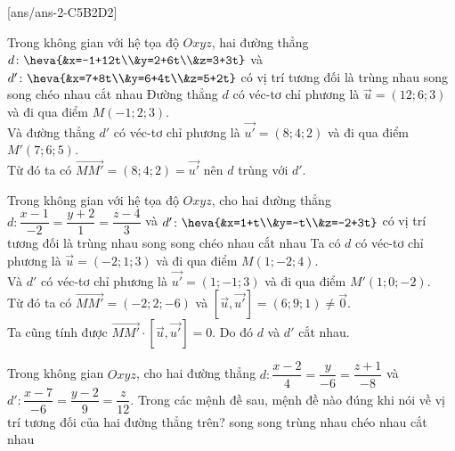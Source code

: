 [ans/ans-2-C5B2D2]
\TN
\begin{ex}%
Trong không gian với hệ tọa độ $Oxyz$, hai đường thẳng $d \colon \heva{&x=-1+12t\\&y=2+6t\\&z=3+3t}$ và  $d' \colon \heva{&x=7+8t\\&y=6+4t\\&z=5+2t}$ có vị trí tương đối là
	\choice
	{\True trùng nhau}
	{song song}
	{chéo nhau}
	{cắt nhau}
	\loigiai
	{Đường thẳng $d$ có véc-tơ chỉ phương là  $\overrightarrow{u}=(12;6;3)$ và đi qua điểm $M(-1;2;3)$.\\
	Và đường thẳng $d'$ có véc-tơ chỉ phương là  $\overrightarrow{u'}=(8;4;2)$ và đi qua điểm $M'(7;6;5)$.\\
	Từ đó ta có $\overrightarrow{MM'}=(8;4;2)=\overrightarrow{u'}$ nên $d$ trùng với $d'$.}
	\end{ex}
\begin{ex}%
	Trong không gian với hệ tọa độ $Oxyz$, cho hai đường thẳng $d \colon \dfrac{x-1}{-2}=\dfrac{y+2}{1}=\dfrac{z-4}{3}$ và  $ d' \colon \heva{&x=1+t\\&y=-t\\&z=-2+3t}$ có vị trí tương đối là
	\choice
	{trùng nhau}
	{song song}
	{chéo nhau}
	{\True  cắt nhau}
	\loigiai
	{Ta có 	$d$ có véc-tơ chỉ phương là  $\overrightarrow{u}=(-2;1;3)$ và đi qua điểm $M(1;-2;4)$.\\
		Và $d'$ có véc-tơ chỉ phương là  $\overrightarrow{u'}=(1;-1;3)$ và đi qua điểm $M'(1;0;-2)$.\\
		Từ đó ta có $\overrightarrow{MM'}=(-2;2;-6)$ và $ \left[\overrightarrow{u},\overrightarrow{u'} \right]=(6;9;1)\ne \overrightarrow{0}$. \\
		Ta cũng tính được $ \overrightarrow{MM'} \cdot \left[\overrightarrow{u},\overrightarrow{u'} \right]=0$. Do đó $d$ và $d'$ cắt nhau.}
\end{ex}
\begin{ex}%
	Trong không gian $Oxyz$, cho hai đường thẳng $d\colon \dfrac{x-2}{4}=\dfrac{y}{-6}=\dfrac{z+1}{-8}$ và $d'\colon \dfrac{x-7}{-6}=\dfrac{y-2}{9}=\dfrac{z}{12}$. Trong các mệnh đề sau, mệnh đề nào đúng khi nói về vị trí tương đối của hai đường thẳng trên?
	\choice
	{\True song song}
	{trùng nhau}
	c{héo nhau}
	{cắt nhau}
\end{ex}
